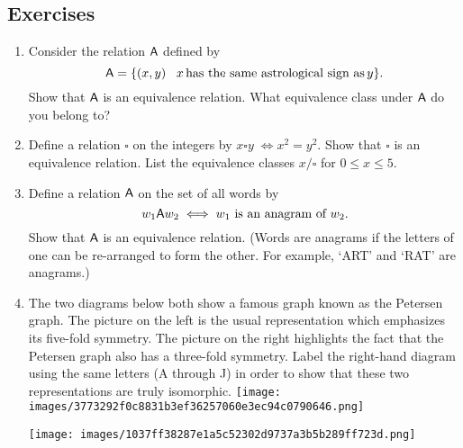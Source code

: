 \documentclass[10pt,]{book}
\theoremstyle{plain}
\theoremstyle{definition}
\theoremstyle{definition}
\numberwithin{equation}{section}
\newcommand{\suchthat}{\;  \;}
\newcommand{\relA}{\mbox{\textsf A}}
\begin{document}
\subsection[{Exercises}]{Exercises}\label{exercises-32}
\leavevmode%
\begin{enumerate}[label=(\alph*)]
\item\hypertarget{li-410}{}
          Consider the relation \(\relA\) defined by
          \begin{equation*}
            \relA = \{ (x,y) \suchthat \; x \, \mbox{has the same astrological sign as}  \, y \}.
          \end{equation*}
          Show that \(\relA\) is an equivalence relation.  What equivalence class
          under \(\relA\) do you belong to?
\item\hypertarget{li-411}{}
          Define a relation \(\square\) on the integers by \(x \square y \; \iff x^2 = y^2\).  Show that \(\square\) is an equivalence relation.  List the equivalence
          classes \(x/\square\) for \(0 \leq x \leq 5\).
\item\hypertarget{li-412}{}
          Define a relation \(\relA\) on the set of all words by
          \begin{equation*}
            w_1 \relA w_2  \iff  w_1 \mbox{ is an anagram of }  w_2.
          \end{equation*}
          Show that \(\relA\) is an equivalence relation.  (Words are anagrams
          if the letters of one can be re-arranged to form the other.  For example, `ART' and `RAT' are anagrams.)
\item\hypertarget{li-413}{}
          The two diagrams below both show a famous graph known as the 
          Petersen graph.  The picture on the 
          left is the usual representation which emphasizes its five-fold symmetry.  The picture on the right
          highlights the fact that the Petersen graph also has a three-fold symmetry.  Label the right-hand diagram
          using the same letters (A through J) in order to show that these two representations are truly isomorphic.
          \texttt{[image: images/3773292f0c8831b3ef36257060e3ec94c0790646.png]}

          \ifx\SetFigFont\undefined\gdef\SetFigFont#1#2#3#4#5{
            \reset@font\fontsize{#1}{#2pt}
            \fontfamily{#3}\fontseries{#4}\fontshape{#5}
            \selectfont}\fi
          \texttt{[image: images/1037ff38287e1a5c52302d9737a3b5b289ff723d.png]}


\end{enumerate}
\end{document}
